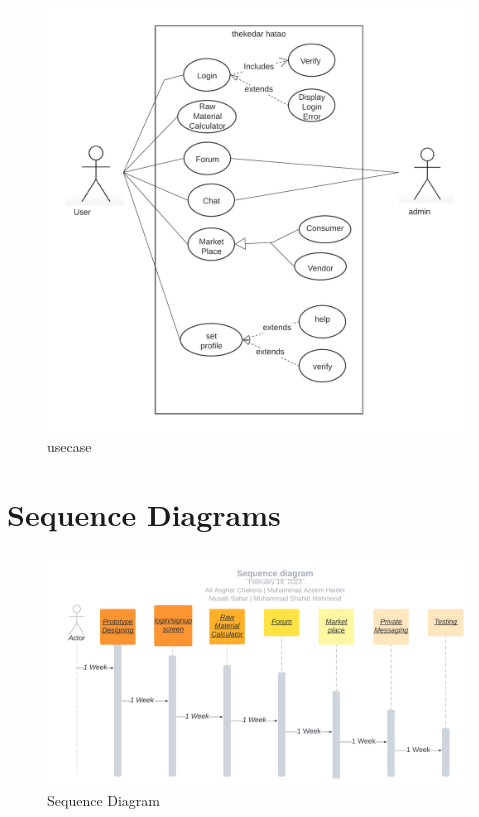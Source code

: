 \documentclass{article}
\begin{document}
\begin{figure}[!h]
      \begin{center}
            \includegraphics[width=1\linewidth]{usecase.png}
            \caption{usecase}
            \label{fig:UML}
      \end{center}
\end{figure}

\newpage

\section*{Sequence Diagrams}
\centering
\begin{figure}[!h]
      \includegraphics[width=1\linewidth]{Sequence diagram.png}
      \caption{Sequence Diagram}
      \label{fig:seq}
\end{figure}
\end{document}
